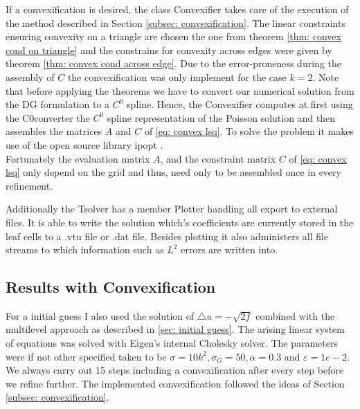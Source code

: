 If a convexification is desired, the class Convexifier takes care of the execution of the method described in Section \ref{subsec: convexification}. The linear constraints ensuring convexity on a triangle are chosen the one from theorem \ref{thm: convex cond on triangle} and the constrains for convexity across edges were given by theorem \ref{thm: convex cond across edge}. Due to the error-proneness during the assembly of $C$ the convexification was only implement for the case $k=2$. Note that before applying the theorems we have to convert our numerical solution from the DG formulation to a $C^0$ spline.
Hence, the Convexifier computes at first using the C0converter the $C^0$ spline representation of the Poisson solution and then assembles the matrices $A$ and $C$ of \eqref{eq: convex lsq}. To solve the problem it makes use of the open source library ipopt \cite{ipopt}.\\
Fortunately the evaluation matrix $A$, and the constraint matrix $C$ of \eqref{eq: convex lsq} only depend on the grid and thus, need only to be assembled once in every refinement.

Additionally the Tsolver has a member Plotter handling all export to external files. It is able to write the solution which's coefficients are currently stored in the leaf cells to a .vtu file or .dat file. Besides plotting it also administers all file streams to which information such as $L^2$ errors are written into.

\subsection{Results with Convexification}

For a initial guess I also used the solution of $\triangle u = -\sqrt{2f}$ combined with the multilevel approach as described in \ref{sec: initial guess}.
The arising linear system of equations was solved with Eigen's internal Cholesky solver.
The parameters were if not other specified taken to be $\sigma=10 k^2, \sigma_G = 50, \alpha =
0.3$ and $\varepsilon = 1e-2$. We always carry out 15 steps including a convexification after every step before we refine further. The implemented convexification followed the ideas of Section \ref{subsec: convexification}. 


